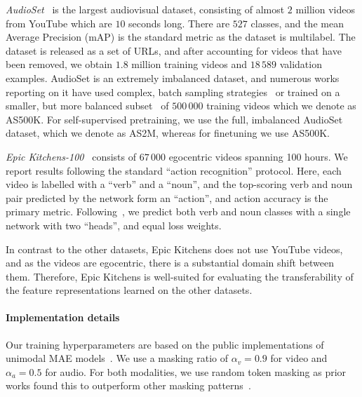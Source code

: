 \documentclass[10pt,twocolumn,letterpaper]{article}
\def \paravspace {-1\baselineskip}
\begin{document}
\noindent\quad\textit{AudioSet}~\cite{gemmeke2017audio} is the largest audiovisual dataset, consisting of almost $2$ million videos from YouTube which are $10$ seconds long.
There are $527$ classes, and the mean Average Precision (mAP) is the standard metric as the dataset is multilabel.
The dataset is released as a set of URLs, and after accounting for videos that have been removed, we obtain $1.8$ million training videos and $18 \, 589$ validation examples. AudioSet is an extremely imbalanced dataset, and numerous works reporting on it have used complex, batch sampling strategies~\cite{gong2021psla, gong2021ast, xu2022masked} or trained on a smaller, but more balanced subset~\cite{nagrani2021attention} of $500 \, 000$ training videos which we denote as AS500K.
For self-supervised pretraining, we use the full, imbalanced AudioSet dataset, which we denote as AS2M, whereas for finetuning we use AS500K.

\noindent\quad\textit{Epic Kitchens-100}~\cite{damen2022rescaling} consists of $67 \, 000$ egocentric videos spanning 100 hours.
We report results following the standard ``action recognition'' protocol.
Here, each video is labelled with a ``verb'' and a ``noun'', and the top-scoring verb and noun pair predicted by the network form an ``action'', and action accuracy is the primary metric.
Following~\cite{arnab2021vivit, yan2022multiview, nagrani2021attention}, we predict both verb and noun classes with a single network with two ``heads'', and equal loss weights. 

In contrast to the other datasets, Epic Kitchens does not use YouTube videos, and as the videos are egocentric, there is a substantial domain shift between them.
Therefore, Epic Kitchens is well-suited for evaluating the transferability of the feature representations learned on the other datasets.



\vspace{\paravspace}
\paragraph{Implementation details}
Our training hyperparameters are based on the public implementations of unimodal MAE models~\cite{he2022masked, tong2022videomae}.
We use a masking ratio of $\alpha_v = 0.9$ for video and $\alpha_a=0.5$ for audio.
For both modalities, we use random token masking as prior works found this to outperform other masking patterns~\cite{he2022masked, feichtenhofer2022masked, xu2022masked}.
\end{document}
